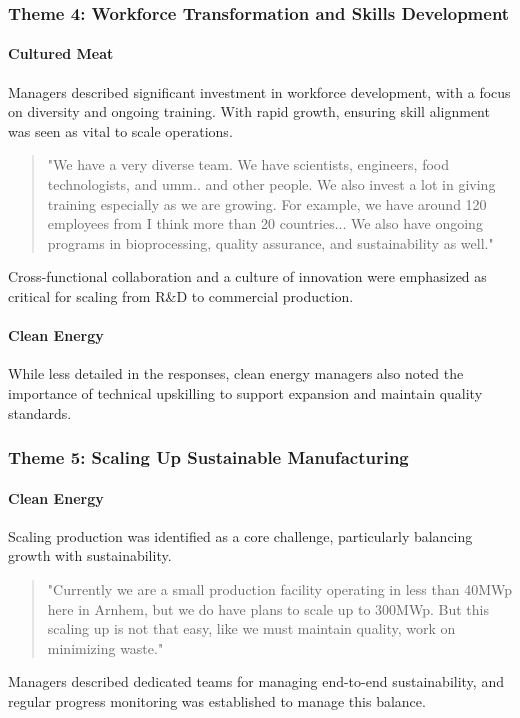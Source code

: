\subsubsection{Theme 4: Workforce Transformation and Skills Development}
\paragraph{Cultured Meat}
Managers described significant investment in workforce development, with a focus on diversity and ongoing training. With rapid growth, ensuring skill alignment was seen as vital to scale operations.
\begin{quote}
	"We have a very diverse team. We have scientists, engineers, food technologists, and umm.. and other people. We also invest a lot in giving training especially as we are growing. For example, we have around 120 employees from I think more than 20 countries... We also have ongoing programs in bioprocessing, quality assurance, and sustainability as well."
\end{quote}
Cross-functional collaboration and a culture of innovation were emphasized as critical for scaling from R\&D to commercial production.

\paragraph{Clean Energy}
While less detailed in the responses, clean energy managers also noted the importance of technical upskilling to support expansion and maintain quality standards.

\subsubsection{Theme 5: Scaling Up Sustainable Manufacturing}
\paragraph{Clean Energy}
Scaling production was identified as a core challenge, particularly balancing growth with sustainability.
\begin{quote}
	"Currently we are a small production facility operating in less than 40MWp here in Arnhem, but we do have plans to scale up to 300MWp. But this scaling up is not that easy, like we must maintain quality, work on minimizing waste."
\end{quote}
Managers described dedicated teams for managing end-to-end sustainability, and regular progress monitoring was established to manage this balance.

